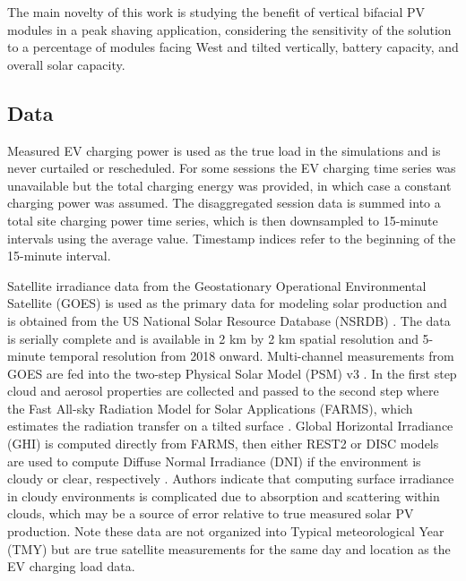 \documentclass[journal,article,submit,pdftex,moreauthors]{Definitions/mdpi}
\begin{document}
The main novelty of this work is studying the benefit of vertical bifacial PV modules in a peak shaving application, considering the sensitivity of the solution to a percentage of modules facing West and tilted vertically, battery capacity, and overall solar capacity.


\subsection{Data}\label{data}%


Measured EV charging power is used as the true load in the simulations and is never curtailed or rescheduled. For some sessions the EV charging time series was unavailable but the total charging energy was provided, in which case a constant charging power was assumed. The disaggregated session data is summed into a total site charging power time series, which is then downsampled to 15-minute intervals using the average value. Timestamp indices refer to the beginning of the 15-minute interval.



Satellite irradiance data from the Geostationary Operational Environmental Satellite (GOES) is used as the primary data for modeling solar production and is obtained from the US National Solar Resource Database (NSRDB) \cite{Sengupta2018}. The data is serially complete and is available in 2 km by 2 km spatial resolution and 5-minute temporal resolution from 2018 onward. Multi-channel measurements from GOES are fed into the two-step Physical Solar Model (PSM) v3 \cite{Sengupta2018}. In the first step cloud and aerosol properties are collected and passed to the second step where the Fast All-sky Radiation Model for Solar Applications (FARMS), which estimates the radiation transfer on a tilted surface \cite{Xie2016}. Global Horizontal Irradiance (GHI) is computed directly from FARMS, then either REST2 or DISC models are used to compute Diffuse Normal Irradiance (DNI) if the environment is cloudy or clear, respectively \cite{Xie2018}. Authors indicate that computing surface irradiance in cloudy environments is complicated due to absorption and scattering within clouds, which may be a source of error relative to true measured solar PV production. Note these data are not organized into Typical meteorological Year (TMY) but are true satellite measurements for the same day and location as the EV charging load data.
\end{document}
